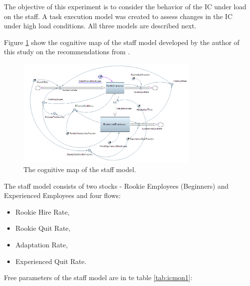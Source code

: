 \documentclass[12pt]{report}
\theoremstyle{definition}
\providecommand{\tightlist}{%
	\setlength{\itemsep}{0pt}\setlength{\parskip}{0pt}}
\begin{document}
The objective of this experiment is to consider the behavior of the IC under load on the staff. 
A task execution model was created to assess changes in the IC under high load conditions. 
All three models are described next. 

Figure \ref{fig:icmon1} show the cognitive map of the staff model developed by the author of this study on the recommendations from \cite{oliva2010d}.

\begin{figure}[ht]
	\centering
	\includegraphics[width=0.8\textwidth]{icmon1}
	\caption{The cognitive map of the staff model.}
	\label{fig:icmon1}
\end{figure}  

The staff model consists of two stocks - Rookie Employees (Beginners) and Experienced Employees  and four flows:

\begin{itemize}
	\label{list:icmon1}
	\tightlist
	\item Rookie Hire Rate,
	\item Rookie Quit Rate,
	\item Adaptation Rate,
	\item Experienced Quit Rate.
\end{itemize}

Free parameters of the staff model are in te table \ref{tab:icmon1}: 
\end{document}
